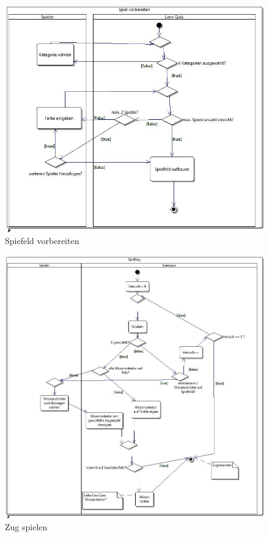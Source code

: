 \documentclass{report}
\begin{document}
\begin{figure}[H]
	\includegraphics[width=\textwidth]{Diagramme/ActivityDiagram-SpielVorbereiten.jpg}
	\caption{Spiefeld vorbereiten}
	\centering
\end{figure}

\begin{figure}[H]
	\includegraphics[width=\textwidth]{Diagramme/ActivityDiagram-Spielzug.jpg}
	\caption{Zug spielen}
	\centering
\end{figure}
\end{document}
